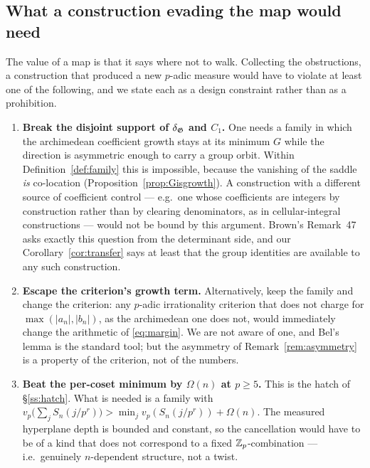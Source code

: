 \subsection{What a construction evading the map would need}\label{ss:evade}

The value of a map is that it says where not to walk. Collecting the obstructions, a
construction that produced a new $p$-adic measure would have to violate at least one of the
following, and we state each as a design constraint rather than as a prohibition.

\begin{enumerate}[label=\textup{(\Alph*)},leftmargin=2.8em,itemsep=5pt]
\item \textbf{Break the disjoint support of $\delta_{\mathfrak{G}}$ and $C_1$.} One needs a family in which
      the archimedean coefficient growth stays at its minimum $G$ while the direction is
      asymmetric enough to carry a group orbit. Within
      Definition~\ref{def:family} this is impossible, because the vanishing of the saddle
      \emph{is} co-location (Proposition~\ref{prop:Gisgrowth}). A construction with a
      different source of coefficient control --- e.g.\ one whose coefficients are integers
      by construction rather than by clearing denominators, as in cellular-integral
      constructions \cite{Brown2014,BrownZudilin2022} --- would not be bound by this
      argument. Brown's Remark~47 \cite{Brown2026} asks exactly this question from the
      determinant side, and our Corollary~\ref{cor:transfer} says at least that the group
      identities are available to any such construction.

\item \textbf{Escape the criterion's growth term.} Alternatively, keep the family and change
      the criterion: any $p$-adic irrationality criterion that does not charge for
      $\max(|a_n|,|b_n|)$, as the archimedean one does not, would immediately change the
      arithmetic of \eqref{eq:margin}. We are not aware of one, and Bel's lemma is the
      standard tool; but the asymmetry of Remark~\ref{rem:asymmetry} is a property of the
      criterion, not of the numbers.

\item \textbf{Beat the per-coset minimum by $\Omega(n)$ at $p\ge5$.} This is the hatch of
      \S\ref{ss:hatch}. What is needed is a family with
      $v_p\bigl(\sum_jS_n(j/p^r)\bigr)>\min_jv_p(S_n(j/p^r))+\Omega(n)$. The measured
      hyperplane depth is bounded and constant, so the cancellation would have to be of a
      kind that does not correspond to a fixed $\mathbb{Z}_p$-combination --- i.e.\ genuinely
      $n$-dependent structure, not a twist.


\end{enumerate}
